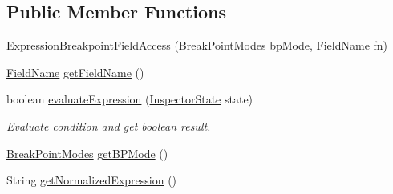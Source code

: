 \subsection*{Public Member Functions}
\begin{DoxyCompactItemize}
\item 
\hyperlink{classgov_1_1nasa_1_1jpf_1_1inspector_1_1server_1_1expression_1_1expressions_1_1_expression_breakpoint_field_access_acf078a0dc2be8afe6574e6217237015c}{Expression\+Breakpoint\+Field\+Access} (\hyperlink{enumgov_1_1nasa_1_1jpf_1_1inspector_1_1server_1_1breakpoints_1_1_break_point_modes}{Break\+Point\+Modes} \hyperlink{classgov_1_1nasa_1_1jpf_1_1inspector_1_1server_1_1expression_1_1expressions_1_1_expression_breakpoint_field_access_ae29473bbd43178e6a1987be832d55484}{bp\+Mode}, \hyperlink{classgov_1_1nasa_1_1jpf_1_1inspector_1_1utils_1_1expressions_1_1_field_name}{Field\+Name} \hyperlink{classgov_1_1nasa_1_1jpf_1_1inspector_1_1server_1_1expression_1_1expressions_1_1_expression_breakpoint_field_access_a09333f12f013e19c50cc328e448990fc}{fn})
\item 
\hyperlink{classgov_1_1nasa_1_1jpf_1_1inspector_1_1utils_1_1expressions_1_1_field_name}{Field\+Name} \hyperlink{classgov_1_1nasa_1_1jpf_1_1inspector_1_1server_1_1expression_1_1expressions_1_1_expression_breakpoint_field_access_aef424e4d5742fbb09010ec9fb4448103}{get\+Field\+Name} ()
\item 
boolean \hyperlink{classgov_1_1nasa_1_1jpf_1_1inspector_1_1server_1_1expression_1_1expressions_1_1_expression_breakpoint_field_access_a8f8daa3d95960df8ec8b528342711473}{evaluate\+Expression} (\hyperlink{interfacegov_1_1nasa_1_1jpf_1_1inspector_1_1server_1_1expression_1_1_inspector_state}{Inspector\+State} state)
\begin{DoxyCompactList}\small\item\em Evaluate condition and get boolean result. \end{DoxyCompactList}\item 
\hyperlink{enumgov_1_1nasa_1_1jpf_1_1inspector_1_1server_1_1breakpoints_1_1_break_point_modes}{Break\+Point\+Modes} \hyperlink{classgov_1_1nasa_1_1jpf_1_1inspector_1_1server_1_1expression_1_1expressions_1_1_expression_breakpoint_field_access_a0c9540df5151b567929d50b6e3260aba}{get\+B\+P\+Mode} ()
\item 
String \hyperlink{classgov_1_1nasa_1_1jpf_1_1inspector_1_1server_1_1expression_1_1expressions_1_1_expression_breakpoint_field_access_a0d4bb69ba3675af4e33bf97b4fc82642}{get\+Normalized\+Expression} ()
\item 

\end{DoxyCompactItemize}

